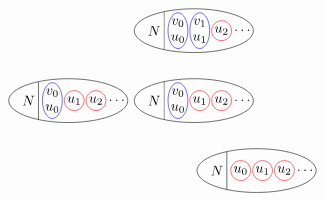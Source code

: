 \begin{equation*}
	\begin{tikzpicture}[xscale=0.5,yscale=0.5]
		\begin{scope}
			\draw (0,0) ellipse (3 and 1.1);
			\clip (0,0) ellipse (3 and 1.1);
			\draw (-1.5,-1) -- (-1.5,1);
			\node at (-2,0) {$N$};
			\node[black] at (-0.8,0) {$u_0$};
			\draw[red] (-0.8,0) circle (0.5);
			\node[black] at (0.3,0) {$u_1$};
			\draw[red] (0.3,0) circle (0.5);
			\node[black] at (1.4,0) {$u_2$};
			\draw[red] (1.4,0) circle (0.5);
			\node at (2.5,0) {$\cdots$};
			\coordinate (b000) at (0,-1.2);
			\coordinate (t000) at (0,1.2);
		\end{scope}
		\begin{scope}[xshift=-270,yshift=100]
			\draw (0,0) ellipse (3 and 1.1);
			\clip (0,0) ellipse (3 and 1.1);
			\draw (-1.5,-1) -- (-1.5,1);
			\node at (-2,0) {$N$};
			\node[black] at (-0.8,-0.4) {$u_0$};
			\node[black] at (-0.8,0.4) {$v_0$};
			\draw[blue] (-0.8,0) ellipse (0.5 and 0.9);
			\node[black] at (0.3,0) {$u_1$};
			\draw[red] (0.3,0) circle (0.5);
			\node[black] at (1.4,0) {$u_2$};
			\draw[red] (1.4,0) circle (0.5);
			\node at (2.5,0) {$\cdots$};
			\coordinate (b001) at (0,-1.2);
			\coordinate (t001) at (0,1.2);
		\end{scope}
		\begin{scope}[xshift=-90,yshift=100]
			\draw (0,0) ellipse (3 and 1.1);
			\clip (0,0) ellipse (3 and 1.1);
			\draw (-1.5,-1) -- (-1.5,1);
			\node at (-2,0) {$N$};
			\node[black] at (-0.8,-0.4) {$u_0$};
			\node[black] at (-0.8,0.4) {$v_0$};
			\draw[blue] (-0.8,0) ellipse (0.5 and 0.9);
			\node[black] at (0.3,0) {$u_1$};
			\draw[red] (0.3,0) circle (0.5);
			\node[black] at (1.4,0) {$u_2$};
			\draw[red] (1.4,0) circle (0.5);
			\node at (2.5,0) {$\cdots$};
			\coordinate (b010) at (0,-1.2);
			\coordinate (t010) at (0,1.2);
		\end{scope}
		\begin{scope}[xshift=-90,yshift=200]
			\draw (0,0) ellipse (3 and 1.1);
			\clip (0,0) ellipse (3 and 1.1);
			\draw (-1.5,-1) -- (-1.5,1);
			\node at (-2,0) {$N$};
			\node[black] at (-0.8,-0.4) {$u_0$};
			\node[black] at (-0.8,0.4) {$v_0$};
			\draw[blue] (-0.8,0) ellipse (0.5 and 0.9);
			\node[black] at (0.3,-0.4) {$u_1$};
			\node[black] at (0.3,0.4) {$v_1$};
			\draw[blue] (0.3,0) ellipse (0.5 and 0.9);
			\node[black] at (1.4,0) {$u_2$};
			\draw[red] (1.4,0) circle (0.5);
			\node at (2.5,0) {$\cdots$};
			\coordinate (b011) at (0,-1.2);
			\coordinate (t011) at (0,1.2);

\end{scope}
\end{tikzpicture}
\end{equation*}
